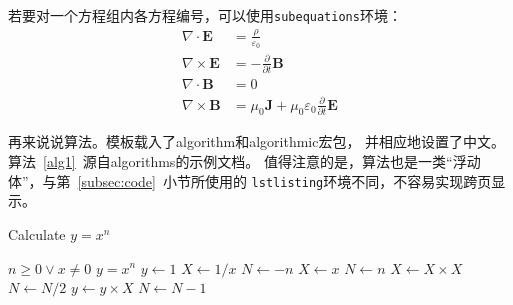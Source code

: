 若要对一个方程组内各方程编号，可以使用\texttt{subequations}环境：
\begin{subequations}
	\begin{align}
		\nabla  \cdot \mathbf{E} & = \frac{\rho }{\varepsilon _0}                                             \\
		\nabla \times \mathbf{E} & = -\frac{\partial}{\partial t}\mathbf{B}                                   \\
		\nabla  \cdot \mathbf{B} & = 0                                                                        \\
		\nabla \times \mathbf{B} & = \mu_0\mathbf{J}+\mu_0\varepsilon _0\frac{\partial}{\partial t}\mathbf{E}
	\end{align}
\end{subequations}


再来说说算法。模板载入了\textsf{algorithm}和\textsf{algorithmic}宏包，
并相应地设置了中文。算法~\ref{alg1}~源自\textsf{algorithms}的示例文档。
值得注意的是，算法也是一类“浮动体”，与第~\ref{subsec:code}~小节所使用的
\texttt{lstlisting}环境不同，不容易实现跨页显示。

\begin{algorithm}[htb]
	\setlength{\baselineskip}{1.5em}
	\caption{Calculate $y = x^n$}
	\label{alg1}
	\begin{algorithmic}[1]	  %
		\REQUIRE $n \geqslant  0 \vee x \neq 0$
		\ENSURE $y = x^n$
		\STATE $y \leftarrow 1$
		\STATE $X \leftarrow 1 / x$
		\STATE $N \leftarrow -n$
		\ELSE
		\STATE $X \leftarrow x$
		\STATE $N \leftarrow n$
		\ENDIF
		\STATE $X \leftarrow X \times X$
		\STATE $N \leftarrow N / 2$
		\ELSE[$N$ is odd]
		\STATE $y \leftarrow y \times X$
		\STATE $N \leftarrow N - 1$
		\ENDIF
		\ENDWHILE
	\end{algorithmic}
\end{algorithm}



